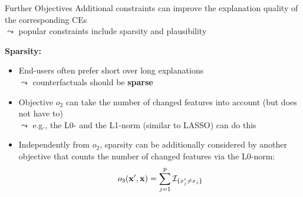 \documentclass[11pt,compress,t,notes=noshow, aspectratio=169, xcolor=table, usenames,dvipsnames]{beamer}
\begin{document}
\begin{frame}{Further Objectives}
	Additional constraints can improve the explanation quality of the corresponding CEs\\
	$\leadsto$ popular constraints include sparsity and plausibility
	
	\lz

	\textbf{Sparsity:}
	\begin{itemize}[<+->]
		\item End-users often prefer short over long explanations\\
		$\leadsto$ %
		counterfactuals should be \textbf{sparse} %
		\item Objective $o_2$ can take the number of changed features into account (but does not have to)\\
		$\leadsto$ e.g., the L0- and the L1-norm (similar to LASSO) can do this
        \item Independently from $o_2$, sparsity can be additionally considered by another objective that counts the number of changed features via the L0-norm:
        $$o_3(\xv', \xv) = \sum_{j = 1}^p {\Ind}_{\{ x'_j \neq x_j \}}$$
	\end{itemize}
\end{frame}
\end{document}
